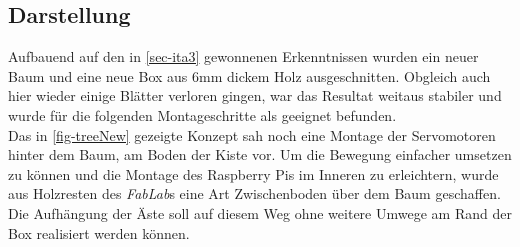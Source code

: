 \documentclass[.../Dokumentation.tex]{subfiles}
\begin{document}
\subsection{Darstellung}\label{sec-ita4-visualization}
Aufbauend auf den in \ref{sec-ita3} gewonnenen Erkenntnissen wurden ein neuer 
Baum und eine neue Box aus 6mm dickem Holz ausgeschnitten. Obgleich auch hier 
wieder einige Blätter verloren gingen, war das Resultat weitaus stabiler und 
wurde für die folgenden Montageschritte als geeignet befunden.\\
Das in \ref{fig-treeNew} gezeigte Konzept sah noch eine Montage der 
Servomotoren hinter dem Baum, am Boden der Kiste vor. 
Um die Bewegung einfacher umsetzen zu können und die Montage des Raspberry 
Pis im Inneren zu erleichtern, wurde aus Holzresten des \textit{FabLab}s eine 
Art Zwischenboden über dem Baum geschaffen. Die Aufhängung der Äste soll 
auf diesem Weg ohne weitere Umwege am Rand der Box realisiert werden können.
\end{document}
